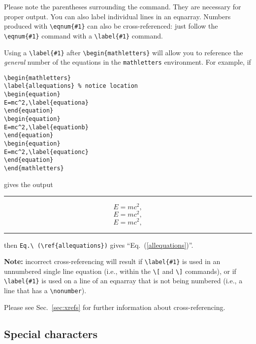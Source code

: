 \smallskip

Please note the parentheses surrounding the command. They are necessary for
proper output. You can also label individual lines in an eqnarray. Numbers
produced with \verb+\eqnum{#1}+ can also be cross-referenced: just follow
the \verb+\eqnum{#1}+ command with a \verb+\label{#1}+ command.

Using a \verb+\label{#1}+ after \verb+\begin{mathletters}+ will allow you
to reference the {\em general\/} number of the equations in the
\verb+mathletters+ environment. For example, if
\begin{verbatim}
\begin{mathletters}
\label{allequations} % notice location
\begin{equation}
E=mc^2,\label{equationa}
\end{equation}
\begin{equation}
E=mc^2,\label{equationb}
\end{equation}
\begin{equation}
E=mc^2,\label{equationc}
\end{equation}
\end{mathletters}
\end{verbatim}


\noindent
gives the output
\smallskip\hrule\smallskip
\begin{mathletters}
\label{allequations}
\begin{equation}
E=mc^2,\label{equationa}
\end{equation}
\begin{equation}
E=mc^2,\label{equationb}
\end{equation}
\begin{equation}
E=mc^2,\label{equationc}
\end{equation}
\end{mathletters}
\smallskip\hrule\smallskip
\noindent
then \verb+Eq.\ (\ref{allequations})+ gives ``Eq.\ (\ref{allequations})''.


{\bf Note:} incorrect cross-referencing will result if \verb+\label{#1}+ is
used in an unnumbered single line equation (i.e., within the \verb+\[+ and
\verb+\]+ commands), or if \verb+\label{#1}+ is used on a line of an
eqnarray that is not being numbered (i.e., a line that has a
\verb+\nonumber+).

Please see Sec.\ \ref{sec:xrefs} for further information about
cross-referencing.

\subsection{Special characters}

